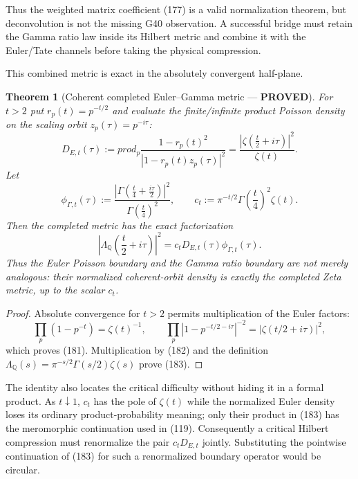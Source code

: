 \documentclass[11pt]{article}
\newtheorem{theorem}{Theorem}
\newcommand{\PROVED}{\textcolor{green!45!black}{\textbf{PROVED}}}
\begin{document}
Thus the weighted matrix coefficient (177) is a valid normalization theorem,
but deconvolution is not the missing G40 observation.  A successful bridge
must retain the Gamma ratio law inside its Hilbert metric and combine it with
the Euler/Tate channels before taking the physical compression.

This combined metric is exact in the absolutely convergent half-plane.

\begin{theorem}[Coherent completed Euler--Gamma metric --- \PROVED]
For $t>2$ put $r_p(t)=p^{-t/2}$ and evaluate the finite/infinite product
Poisson density on the scaling orbit $z_p(\tau)=p^{-i\tau}$:
\begin{equation}
 D_{E,t}(\tau):=prod_p
 \frac{1-r_p(t)^2}{|1-r_p(t)z_p(\tau)|^2}
 =\frac{|\zeta(\frac t2+i\tau)|^2}{\zeta(t)}.        \tag{181}
\end{equation}
Let
\begin{equation}
 \phi_{\Gamma,t}(\tau):=
 \frac{|\Gamma(\frac t4+\frac{i\tau}{2})|^2}
      {\Gamma(\frac t4)^2},
 \qquad
 c_t:=\pi^{-t/2}\Gamma\left(\frac t4\right)^2\zeta(t).
                                                               \tag{182}
\end{equation}
Then the completed metric has the exact factorization
\begin{equation}
 \left|\Lambda_{\mathbb Q}\left(\frac t2+i\tau\right)\right|^2
 =c_tD_{E,t}(\tau)\phi_{\Gamma,t}(\tau).             \tag{183}
\end{equation}
Thus the Euler Poisson boundary and the Gamma ratio boundary are not merely
analogous: their normalized coherent-orbit density is exactly the completed
Zeta metric, up to the scalar $c_t$.
\end{theorem}

\begin{proof}
Absolute convergence for $t>2$ permits multiplication of the Euler factors:
\[
 \prod_p(1-p^{-t})=\zeta(t)^{-1},\qquad
 \prod_p|1-p^{-t/2-i\tau}|^{-2}
 =|\zeta(t/2+i\tau)|^2,
\]
which proves (181).  Multiplication by (182) and the definition
$\Lambda_{\mathbb Q}(s)=\pi^{-s/2}\Gamma(s/2)\zeta(s)$ prove (183).
\end{proof}

The identity also locates the critical difficulty without hiding it in a
formal product.  As $t\downarrow1$, $c_t$ has the pole of $\zeta(t)$ while
the normalized Euler density loses its ordinary product-probability meaning;
only their product in (183) has the meromorphic continuation used in (119).
Consequently a critical Hilbert compression must renormalize the pair
$c_tD_{E,t}$ jointly.  Substituting the pointwise continuation of (183) for
such a renormalized boundary operator would be circular.
\end{document}
